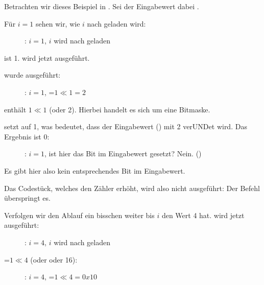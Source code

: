 ﻿\clearpage
\mysubparagraph{\olly}
\myindex{\olly}

Betrachten wir dieses Beispiel in \olly. 
Sei der Eingabewert dabei .

Für $i=1$ sehen wir, wie $i$ nach \ECX geladen wird: 

\begin{figure}[H]
\centering
{}
\caption{\olly: $i=1$, $i$ wird nach \ECX geladen}
\label{fig:shifts_olly1_1}
\end{figure}

\EDX ist 1. \SHL wird jetzt ausgeführt.

\clearpage
\SHL wurde ausgeführt:

\begin{figure}[H]
\centering
{}
\caption{\olly: $i=1$, \EDX=$1 \ll 1=2$}
\label{fig:shifts_olly1_2}
\end{figure}

\EDX enthält $1 \ll 1$ (oder 2). Hierbei handelt es sich um eine Bitmaske.

\clearpage
\AND setzt \ZF auf 1, was bedeutet, dass der Eingabewert () 
mit 2 verUNDet wird. Das Ergebnis ist 0:

\begin{figure}[H]
\centering
{}
\caption{\olly: $i=1$, 
ist hier das Bit im Eingabewert gesetzt? Nein. ()}
\label{fig:shifts_olly1_3}
\end{figure}
Es gibt hier also kein entsprechendes Bit im Eingabewert.

Das Codestück, welches den Zähler erhöht, wird also nicht ausgeführt:
Der \JZ Befehl überspringt es.

\clearpage
Verfolgen wir den Ablauf ein bisschen weiter bis $i$ den Wert 4 hat.
\SHL wird jetzt ausgeführt:

\begin{figure}[H]
\centering
{}
\caption{\olly: $i=4$, $i$ wird nach \ECX geladen}
\label{fig:shifts_olly4_1}
\end{figure}

\clearpage
\EDX=$1 \ll 4$ (oder  oder 16): 

\begin{figure}[H]
\centering
{}
\caption{\olly: $i=4$, \EDX=$1 \ll 4=0x10$}
\label{fig:shifts_olly4_2}
\end{figure}

